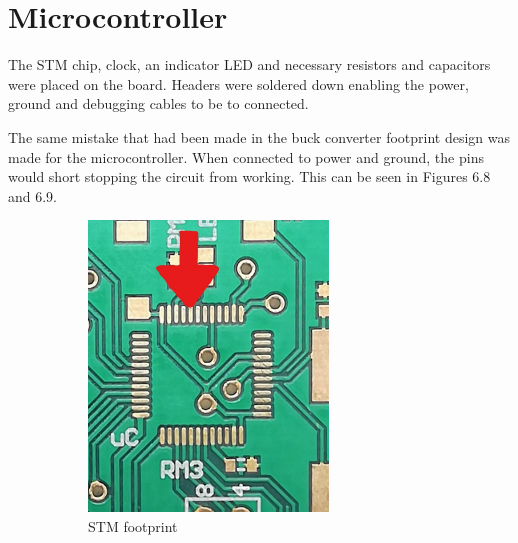 \section{Microcontroller}
\vspace{-5mm}
The STM chip, clock, an indicator LED and necessary resistors and capacitors were placed on the board. Headers were soldered down enabling the power, ground and debugging cables to be to connected. 

The same mistake that had been made in the buck converter footprint design was made for the microcontroller. When connected to power and ground, the pins would short stopping the circuit from working. This can be seen in Figures 6.8 and 6.9.

\vspace{-2mm}
\begin{figure}[H]
  \centering
  \begin{minipage}[b]{0.45\textwidth}
    \begin{figure}[H]
        \centering
        \includegraphics[width=0.7\textwidth]{footprint_micro.jpg}
        \caption{STM footprint}
    \end{figure}
  \end{minipage}
  \hfill
  \begin{minipage}[b]{0.45\textwidth}
    \begin{figure}[H]
        \centering

\end{figure}
\end{minipage}
\end{figure}
